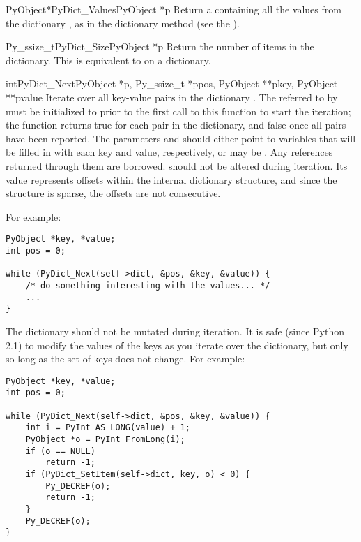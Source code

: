 \begin{cfuncdesc}{PyObject*}{PyDict_Values}{PyObject *p}
  Return a  containing all the values from the
  dictionary , as in the dictionary method 
  (see the ).
\end{cfuncdesc}

\begin{cfuncdesc}{Py_ssize_t}{PyDict_Size}{PyObject *p}
  Return the number of items in the dictionary.  This is equivalent
  to  on a dictionary.
\end{cfuncdesc}

\begin{cfuncdesc}{int}{PyDict_Next}{PyObject *p, Py_ssize_t *ppos,
                                    PyObject **pkey, PyObject **pvalue}
  Iterate over all key-value pairs in the dictionary .  The
   referred to by  must be initialized to
   prior to the first call to this function to start the
  iteration; the function returns true for each pair in the
  dictionary, and false once all pairs have been reported.  The
  parameters  and  should either point to
   variables that will be filled in with each key and
  value, respectively, or may be \NULL{}.  Any references returned through
  them are borrowed.   should not be altered during iteration.
  Its value represents offsets within the internal dictionary structure,
  and since the structure is sparse, the offsets are not consecutive.

  For example:

\begin{verbatim}
PyObject *key, *value;
int pos = 0;

while (PyDict_Next(self->dict, &pos, &key, &value)) {
    /* do something interesting with the values... */
    ...
}
\end{verbatim}

  The dictionary  should not be mutated during iteration.  It
  is safe (since Python 2.1) to modify the values of the keys as you
  iterate over the dictionary, but only so long as the set of keys
  does not change.  For example:

\begin{verbatim}
PyObject *key, *value;
int pos = 0;

while (PyDict_Next(self->dict, &pos, &key, &value)) {
    int i = PyInt_AS_LONG(value) + 1;
    PyObject *o = PyInt_FromLong(i);
    if (o == NULL)
        return -1;
    if (PyDict_SetItem(self->dict, key, o) < 0) {
        Py_DECREF(o);
        return -1;
    }
    Py_DECREF(o);
}
\end{verbatim}
\end{cfuncdesc}

